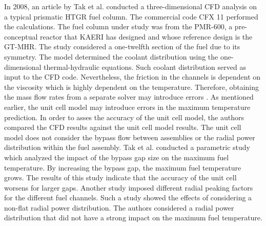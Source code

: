 \documentclass[11pt,letterpaper]{article}
\begin{document}
In 2008, an article by Tak et al. \cite{tak_numerical_2008} conducted  a three-dimensional \gls{CFD} analysis on a typical prismatic \gls{HTGR} fuel column.
The commercial code CFX 11 \cite{ansys_incorporated_cfx_2006} performed the calculations.
The fuel column under study was from the PMR-600, a pre-conceptual reactor that \gls{KAERI} has designed and whose reference design is the GT-MHR.
The study considered a one-twelfth section of the fuel due to its symmetry.
The model determined the coolant distribution using the one-dimensional thermal-hydraulic equations.
Such coolant distribution served as input to the CFD code.
Nevertheless, the friction in the channels is dependent on the viscosity which is highly dependent on the temperature.
Therefore, obtaining the mass flow rates from a separate solver may introduce errors \cite{sato_computational_2010}.
As mentioned earlier, the unit cell model may introduce errors in the maximum temperature prediction.
In order to asses the accuracy of the unit cell model, the authors compared the CFD results against the unit cell model results.
The unit cell model does not consider the bypass flow between assemblies or the radial power distribution within the fuel assembly.
Tak et al. conducted a parametric study which analyzed the impact of the bypass gap size on the maximum fuel temperature.
By increasing the bypass gap, the maximum fuel temperature grows.
The results of this study indicate that the accuracy of the unit cell worsens for larger gaps.
Another study imposed different radial peaking factors for the different fuel channels.
Such a study showed the effects of considering a non-flat radial power distribution.
The authors considered a radial power distribution that did not have a strong impact on the maximum fuel temperature.
\end{document}
